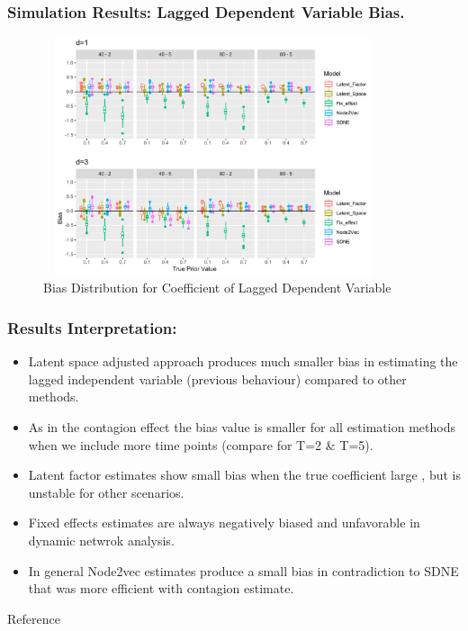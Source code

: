 \documentclass{beamer}
\begin{document}
\begin{frame}
\frametitle{Simulation Results: Lagged Dependent Variable Bias.  }
\begin{figure}[H]
  \centering
  \includegraphics[width=10cm, height=7cm]{plot2.pdf}
  \caption{Bias Distribution for Coefficient of Lagged Dependent Variable}
  \label{Fig:fig2}
\end{figure}
\end{frame}

\begin{frame}
\frametitle{Results Interpretation: }
\begin{itemize}
\item Latent space adjusted approach produces much smaller bias in estimating the lagged independent variable  (previous behaviour) compared to other methods.
\vspace{10pt}
\item As in the contagion effect the bias  value is smaller for all estimation methods when we include more time points (compare for T=2 \& T=5).
\vspace{10pt}

\item Latent factor estimates show small bias when the true coefficient large , but is unstable for other scenarios.
\vspace{10pt}
\item Fixed effects estimates are always negatively biased and unfavorable in dynamic netwrok analysis.
\vspace{10pt}
\item In general Node2vec estimates  produce a small bias in contradiction to SDNE that was more efficient with contagion estimate. 
\end{itemize}
\end{frame}
\begin{frame} [allowframebreaks]{Reference}
\small

\end{frame}
\end{document}
